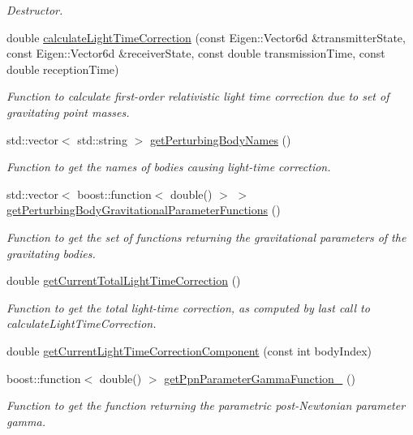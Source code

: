 \begin{DoxyCompactItemize}
\begin{DoxyCompactList}\small\item\em Destructor. \end{DoxyCompactList}\item 
double \hyperlink{classtudat_1_1observation__models_1_1FirstOrderLightTimeCorrectionCalculator_a068dc8bfba9d0c432f68bdf1dad5018e}{calculate\+Light\+Time\+Correction} (const Eigen\+::\+Vector6d \&transmitter\+State, const Eigen\+::\+Vector6d \&receiver\+State, const double transmission\+Time, const double reception\+Time)
\begin{DoxyCompactList}\small\item\em Function to calculate first-\/order relativistic light time correction due to set of gravitating point masses. \end{DoxyCompactList}\item 
std\+::vector$<$ std\+::string $>$ \hyperlink{classtudat_1_1observation__models_1_1FirstOrderLightTimeCorrectionCalculator_aac1f4742269989af210f97add08d81f3}{get\+Perturbing\+Body\+Names} ()
\begin{DoxyCompactList}\small\item\em Function to get the names of bodies causing light-\/time correction. \end{DoxyCompactList}\item 
std\+::vector$<$ boost\+::function$<$ double() $>$ $>$ \hyperlink{classtudat_1_1observation__models_1_1FirstOrderLightTimeCorrectionCalculator_ae6e78e045a3623f7a0356376808583a0}{get\+Perturbing\+Body\+Gravitational\+Parameter\+Functions} ()
\begin{DoxyCompactList}\small\item\em Function to get the set of functions returning the gravitational parameters of the gravitating bodies. \end{DoxyCompactList}\item 
double \hyperlink{classtudat_1_1observation__models_1_1FirstOrderLightTimeCorrectionCalculator_aba33789466489bf4cbfa0b150754ffde}{get\+Current\+Total\+Light\+Time\+Correction} ()
\begin{DoxyCompactList}\small\item\em Function to get the total light-\/time correction, as computed by last call to calculate\+Light\+Time\+Correction. \end{DoxyCompactList}\item 
double \hyperlink{classtudat_1_1observation__models_1_1FirstOrderLightTimeCorrectionCalculator_a822e03d3eb61af5a7691e17286a83e81}{get\+Current\+Light\+Time\+Correction\+Component} (const int body\+Index)
\item 
boost\+::function$<$ double() $>$ \hyperlink{classtudat_1_1observation__models_1_1FirstOrderLightTimeCorrectionCalculator_a1ffb34f9c40d0aeb9e43cbb3eb234159}{get\+Ppn\+Parameter\+Gamma\+Function\+\_\+} ()
\begin{DoxyCompactList}\small\item\em Function to get the function returning the parametric post-\/\+Newtonian parameter gamma. \end{DoxyCompactList}\end{DoxyCompactItemize}
